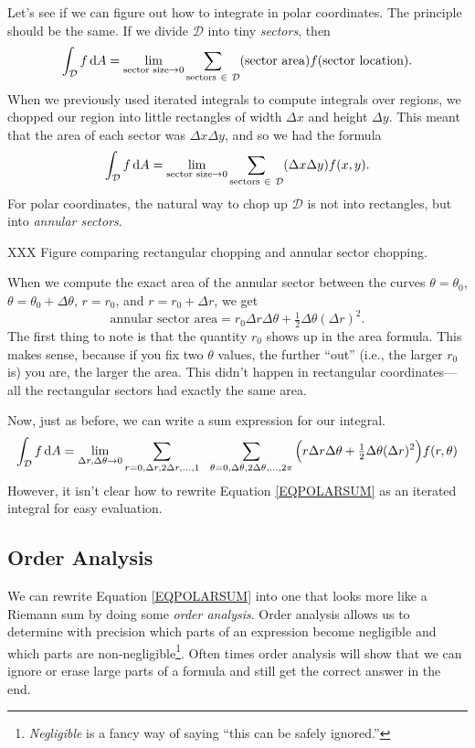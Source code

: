 Let's see if we can figure out how to integrate in polar coordinates.  The principle should be the same.
If we divide $\mathcal D$ into tiny \emph{sectors}, then
\[
	\int_{\mathcal D} f\,\mathrm{d} A =\lim_{\text{sector size}\to 0} \sum_{\text{sectors}\ \in\ \mathcal D} (\text{sector
	area})f(\text{sector location}).
\]
When we previously used iterated integrals to compute integrals over regions, we chopped 
our region into little rectangles of width $\Delta x$ and height $\Delta y$.  This meant
that the area of each sector was $\Delta x\Delta y$, and so we had the formula
\[
	\int_{\mathcal D} f\,\d A =\lim_{\text{sector size}\to 0} \sum_{\text{sectors}\ \in\ \mathcal D} 
	(\Delta x\Delta y) f(x,y).
\]
For polar coordinates, 
the natural way to chop up $\mathcal D$ is not into rectangles, but
into \emph{annular sectors}.

XXX Figure comparing rectangular chopping and annular sector chopping.

When we compute the exact area of the annular sector between the curves
$\theta=\theta_0$, $\theta=\theta_0+\Delta\theta$, $r=r_0$, and $r=r_0+\Delta r$, 
we get 
\[
	\text{annular sector area} = r_0\Delta r\Delta \theta + \tfrac{1}{2}\Delta\theta(\Delta r)^2.
\]
The first thing to note is that the quantity $r_0$ shows up in the area formula.  
This makes sense, because if you fix two $\theta$ values, the further ``out'' (i.e., the larger
$r_0$ is) you are, the larger the area.  This didn't happen in rectangular coordinates---all the rectangular
sectors had exactly the same area.

Now, just as before, we can write a sum expression for our integral.
\begin{equation}
	\label{EQPOLARSUM}
	\int_{\mathcal D} f\,\d A =\lim_{\Delta r,\Delta \theta\to 0}
	\sum_{r=0,\Delta r,2\Delta r,\ldots,1}\ \ \sum_{\theta=0,\Delta\theta,
	2\Delta\theta, \ldots, 2\pi} \Big(
		r\Delta r\Delta \theta + \tfrac{1}{2}\Delta\theta(\Delta r)^2
	\Big)f(r,\theta)
\end{equation}
However, it isn't clear how to rewrite Equation \eqref{EQPOLARSUM} as an iterated integral
for easy evaluation.

\subsection{Order Analysis}
We can rewrite Equation \eqref{EQPOLARSUM} into one that looks more like a Riemann sum by
doing some \emph{order analysis}.  Order analysis allows us to determine
with precision
which parts of an expression become negligible and which parts are non-negligible\footnote{ \emph{Negligible}
is a fancy way of saying ``this can be safely ignored.''}.  Often
times order analysis will show that we can ignore or erase large parts of a formula and still
get the correct answer in the end.


